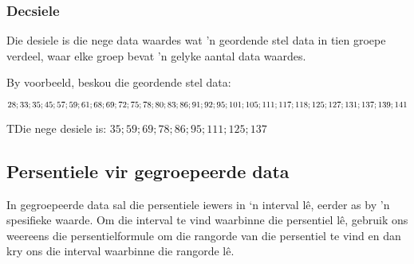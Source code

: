 \subsubsection*{Decsiele}
Die desiele is die nege data waardes wat 'n geordende stel data in tien groepe verdeel, waar elke groep bevat 'n gelyke aantal data waardes.

\par
By voorbeeld, beskou die geordende stel data:
\begin{center}
$28; 33; 35; 45; 57; 59; 61; 68; 69; 72; 75; 78; 80; 83; 86; 91; 92; \\
95; 101; 105; 111; 117; 118; 125; 127; 131; 137; 139; 141$\\
\end{center}
TDie nege desiele is: $35; 59; 69; 78; 86; 95; 111; 125; 137$


\subsection{Persentiele vir gegroepeerde data}

In gegroepeerde data sal die persentiele iewers in ‘n interval lê, eerder as by ’n spesifieke waarde. Om die interval te vind waarbinne die persentiel lê, gebruik ons weereens die persentielformule om die rangorde van die persentiel te vind en dan kry ons die interval waarbinne die rangorde l\^e.

